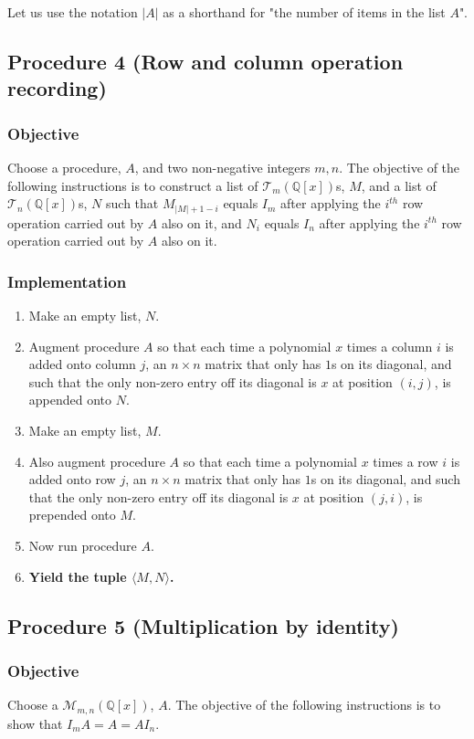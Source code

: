 \documentclass[twocolumn]{article}
\begin{document}
		Let us use the notation $\lvert A\rvert$ as a shorthand for "the number of items in the list $A$".
		\subsection{Procedure 4 (Row and column operation recording)}\label{sec:procedure 4}
			\subsubsection{Objective}
				Choose a procedure, $A$, and two non-negative integers $m,n$. The objective of the following instructions is to construct a list of $\mathcal{T}_{m}(\mathbb{Q}[x])$s, $M$, and a list of $\mathcal{T}_{n}(\mathbb{Q}[x])$s, $N$ such that $M_{\lvert M\rvert +1-i}$ equals $I_m$ after applying the $i^{th}$ row operation carried out by $A$ also on it, and $N_i$ equals $I_n$ after applying the $i^{th}$ row operation carried out by $A$ also on it.
			\subsubsection{Implementation}
				\begin{enumerate}
					\item Make an empty list, $N$.
					\item Augment procedure $A$ so that each time a polynomial $x$ times a column $i$ is added onto column $j$, an $n\times n$ matrix that only has $1$s on its diagonal, and such that the only non-zero entry off its diagonal is $x$ at position $(i,j)$, is appended onto $N$.
					\item Make an empty list, $M$.
					\item Also augment procedure $A$ so that each time a polynomial $x$ times a row $i$ is added onto row $j$, an $n\times n$ matrix that only has $1$s on its diagonal, and such that the only non-zero entry off its diagonal is $x$ at position $(j,i)$, is prepended onto $M$.
					\item Now run procedure $A$.
					\item \textbf{Yield the tuple $\langle M,N\rangle$.}
				\end{enumerate}
		\subsection{Procedure 5 (Multiplication by identity)}\label{sec:procedure 5}
			\subsubsection{Objective}
				Choose a $\mathcal{M}_{m,n}(\mathbb{Q}[x])$, $A$. The objective of the following instructions is to show that $I_mA=A=AI_n$.
\end{document}
